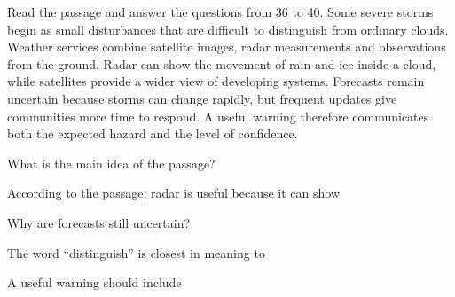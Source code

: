 \begin{baidoc}
\item[] Read the passage and answer the questions from 36 to 40.
Some severe storms begin as small disturbances that are difficult to distinguish from ordinary clouds. Weather services combine satellite images, radar measurements and observations from the ground. Radar can show the movement of rain and ice inside a cloud, while satellites provide a wider view of developing systems. Forecasts remain uncertain because storms can change rapidly, but frequent updates give communities more time to respond. A useful warning therefore communicates both the expected hazard and the level of confidence.

\begin{ex}
What is the main idea of the passage?
\end{ex}

\begin{ex}
According to the passage, radar is useful because it can show
\end{ex}

\begin{ex}
Why are forecasts still uncertain?
\end{ex}

\begin{ex}
The word “distinguish” is closest in meaning to
\end{ex}

\begin{ex}
A useful warning should include
\end{ex}
\end{baidoc}

